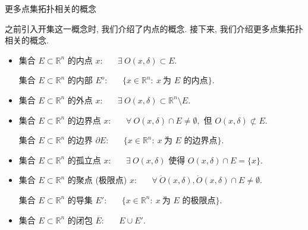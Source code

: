 
\begin{frame}{更多点集拓扑相关的概念}

之前引入开集这一概念时, 我们介绍了内点的概念. 接下来, 我们介绍更多点集拓扑相关的概念.

\pause
\vspace{1em}

\begin{itemize}[<+->]
\item 集合 $E \subset \mathbb{R}^n$ 的内点 $x:$ ~~ $\exists ~ O(x, \delta) \subset E.$ \par
集合 $E \subset \mathbb{R}^n$ 的内部 $E^o:$ ~~ $\{ x \in \mathbb{R}^n: ~ x ~ \text{为 $E$ 的内点} \}.$
\item 集合 $E \subset \mathbb{R}^n$ 的外点 $x:$ ~~ $\exists ~ O(x, \delta) \subset \mathbb{R}^n \setminus E.$
\item 集合 $E \subset \mathbb{R}^n$ 的边界点 $x:$ ~~ $\forall ~ O(x, \delta) \cap E \neq \emptyset,$ 但 $O(x, \delta) \not\subset E.$ \par
集合 $E \subset \mathbb{R}^n$ 的边界 $\partial E:$ ~~ $\{ x \in \mathbb{R}^n: ~ x ~ \text{为 $E$ 的边界点} \}.$
\item 集合 $E \subset \mathbb{R}^n$ 的孤立点 $x:$ ~~ $\exists ~ O(x, \delta)$ 使得 $O(x, \delta) \cap E = \{x\}.$
\item 集合 $E \subset \mathbb{R}^n$ 的聚点 (极限点) $x:$ ~~ $\forall ~ \mathring{O}(x, \delta), \mathring{O}(x, \delta) \cap E \neq \emptyset.$ \par
集合 $E \subset \mathbb{R}^n$ 的导集 $E':$ ~~ $\{ x \in \mathbb{R}^n: ~ x ~ \text{为 $E$ 的极限点} \}.$
\item 集合 $E \subset \mathbb{R}^n$ 的闭包 $\overline{E}:$ ~~ $E \cup E'.$
\end{itemize}

\end{frame}


